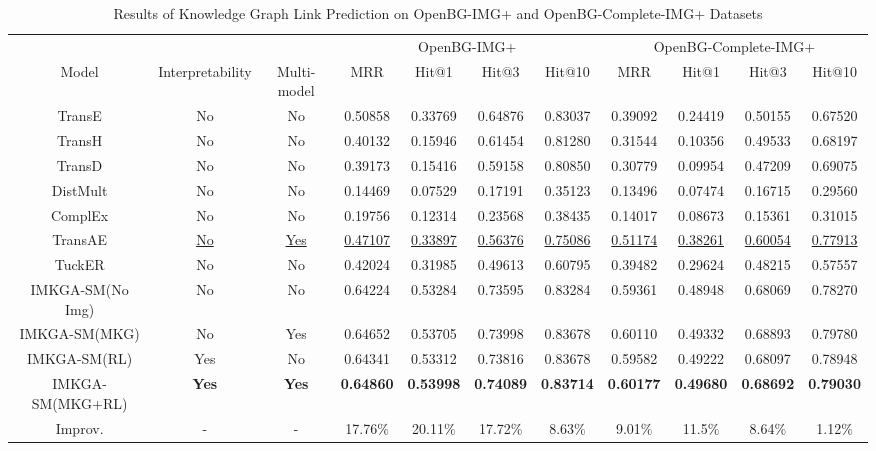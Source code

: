 \documentclass[10pt,journal,compsoc]{IEEEtran}
\begin{document}
\begin{table}[t]
\begin{center}
\caption{Results of Knowledge Graph Link Prediction on OpenBG-IMG+ and OpenBG-Complete-IMG+ Datasets}
\label{tab2}
\begin{tabular}{c|c|c|cccc|cccc}
\hline
    &   &  & \multicolumn{4}{c|}{OpenBG-IMG+}  & \multicolumn{4}{c}{OpenBG-Complete-IMG+}   \\
 Model & \!Interpretability\! & Multi-model & MRR              & Hit@1            & Hit@3            & Hit@10  & MRR              & Hit@1            & Hit@3            & Hit@10   \\ \hline
TransE \cite{ref1}    &  No  &  No   & 0.50858          & 0.33769          & 0.64876          & 0.83037   & 0.39092  &  0.24419 & 0.50155  &0.67520 \\
TransH \cite{ref5}   &  No  &  No  & 0.40132          & 0.15946          & 0.61454          & 0.81280    & 0.31544  &  0.10356 & 0.49533  &0.68197 \\
TransD \cite{ref66}   &  No  &  No  & 0.39173          & 0.15416          & 0.59158          & 0.80850  &0.30779   & 0.09954  & 0.47209  & 0.69075 \\
DistMult \cite{ref22}  &  No &  No  & 0.14469 & 0.07529    & 0.17191    & 0.35123       & 0.13496  &0.07474   & 0.16715  &   0.29560     \\
ComplEx \cite{ref16}   &  No  &  No  & 0.19756          & 0.12314          & 0.23568          & 0.38435  &  0.14017 &  0.08673 & 0.15361  & 0.31015 \\
TransAE \cite{ref14}   & \underline{No} &  \underline{Yes} & \underline{0.47107}          & \underline{0.33897}          & \underline{0.56376}          & \underline{0.75086}     & \underline{0.51174}  & \underline{0.38261}  &  \underline{0.60054} &    \underline{0.77913} \\
TuckER \cite{ref7}   & No  &  No & 0.42024          & 0.31985          & 0.49613          & 0.60795    & 0.39482  &  0.29624 & 0.48215  & 0.57557  \\\hline
IMKGA-SM(No Img) &   No &    No  &  0.64224  &  0.53284  &  0.73595  &  0.83284      &  0.59361  & 0.48948  & 0.68069  & 0.78270 \\
IMKGA-SM(MKG) &   No    &   Yes  & 0.64652      &  0.53705     &  0.73998    & 0.83678   & 0.60110  &   0.49332  & 0.68893  & 0.79780  \\
IMKGA-SM(RL) &   Yes   &   No   &  0.64341     &    0.53312   &     0.73816   &  0.83678  & 0.59582  &  0.49222  &0.68097  & 0.78948 \\
IMKGA-SM(MKG+RL) &    \textbf{Yes} &    \textbf{Yes} &  \textbf{0.64860}  & \textbf{0.53998}    &  \textbf{ 0.74089 }   &  \textbf{ 0.83714}     & \textbf{0.60177}  &  \textbf{0.49680}  &  \textbf{0.68692} &  \textbf{0.79030}\\\hline
Improv. & - & - &17.76$\%$  &20.11$\%$ & 17.72$\%$&8.63$\%$ &9.01$\%$ & 11.5$\%$ & 8.64$\%$ &1.12$\%$  \\\hline
\end{tabular}
\end{center}
\end{table}\par
\end{document}
